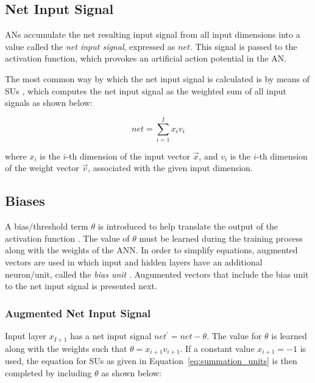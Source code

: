 \subsection{Net Input Signal}
\label{sec:anns:an:net_input}

\acp{AN} accumulate the net resulting input signal from all input dimensions
into a value called the \textit{net input signal},
expressed as $net$. This signal is passed to the activation function, which provokes an artificial action potential in
the \ac{AN}.

The most common way by which the net input signal is
calculated is by means of \acp{SU} \cite{ref:engelbrecht:2007}, which
computes the net input signal as the weighted sum of all
input signals as shown below:

\begin{equation}
    net = \sum_{i=1}^{I}{x_{i}v_{i}}
    \label{eq:summation_units}
\end{equation}

\noindent where $x_{i}$ is the $i$-th
dimension of the input vector $\vec{x}$, and $v_{i}$ is the $i$-th dimension of
the weight vector $\vec{v}$, associated with the given input dimension. 


\subsection{Biases}
\label{sec:anns:an:biases}

A bias/threshold term $\theta$ is introduced to help translate the output of the
activation function \cite{ref:benitez:1997}. The
value of $\theta$ must be learned during the training process along with the
weights of the \ac{ANN}. In order to simplify equations, augmented vectors are
used in which input and hidden layers have an additional neuron/unit, called the
\textit{bias unit} \cite{ref:engelbrecht:2007}. Augumented vectors that include
the bias unit to the net input signal is presented next.


\subsubsection{Augmented Net Input Signal}
\label{sec:anns:an:biases:augmented_net_input_signal}

Input layer $x_{I+1}$ has a net input signal $net^{'} = net - \theta$. The value
for $\theta$ is learned along with the weights such that $\theta =
x_{i+1}v_{i+1}$. If a constant value $x_{i+1} = -1$ is used, the equation for
\acp{SU} as given in Equation~\eqref{eq:summation_units} is then completed by
including $\theta$ as shown below:

